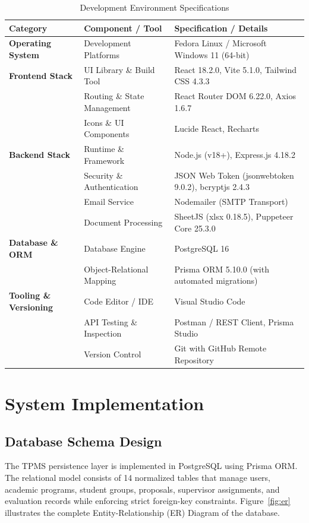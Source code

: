 \begin{table}[H]
\centering
\caption{Development Environment Specifications}
\label{tab:dev_env}
\vspace{4pt}
\small
\begin{tabularx}{\textwidth}{@{}l p{4.2cm} X@{}}
\toprule
\textbf{Category} & \textbf{Component / Tool} & \textbf{Specification / Details} \\
\midrule
\textbf{Operating System} & Development Platforms & Fedora Linux / Microsoft Windows 11 (64-bit) \\

\textbf{Frontend Stack} & UI Library \& Build Tool & React 18.2.0, Vite 5.1.0, Tailwind CSS 4.3.3 \\
 & Routing \& State Management & React Router DOM 6.22.0, Axios 1.6.7 \\
 & Icons \& UI Components & Lucide React, Recharts \\

\textbf{Backend Stack} & Runtime \& Framework & Node.js (v18+), Express.js 4.18.2 \\
 & Security \& Authentication & JSON Web Token (jsonwebtoken 9.0.2), bcryptjs 2.4.3 \\
 & Email Service & Nodemailer (SMTP Transport) \\
 & Document Processing & SheetJS (xlsx 0.18.5), Puppeteer Core 25.3.0 \\

\textbf{Database \& ORM} & Database Engine & PostgreSQL 16 \\
 & Object-Relational Mapping & Prisma ORM 5.10.0 (with automated migrations) \\

\textbf{Tooling \& Versioning} & Code Editor / IDE & Visual Studio Code \\
 & API Testing \& Inspection & Postman / REST Client, Prisma Studio \\
 & Version Control & Git with GitHub Remote Repository \\
\bottomrule
\end{tabularx}
\end{table}

\section{System Implementation}

\subsection{Database Schema Design}
The TPMS persistence layer is implemented in PostgreSQL using Prisma ORM. The relational model consists of 14 normalized tables that manage users, academic programs, student groups, proposals, supervisor assignments, and evaluation records while enforcing strict foreign-key constraints. Figure~\ref{fig:er} illustrates the complete Entity-Relationship (ER) Diagram of the database.

